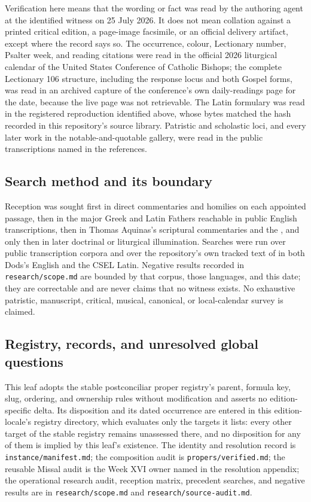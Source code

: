 Verification here means that the wording or fact was read by the authoring
agent at the identified witness on 25 July 2026. It does not mean collation
against a printed critical edition, a page-image facsimile, or an official
delivery artifact, except where the record says so. The occurrence, colour,
Lectionary number, Psalter week, and reading citations were read in the
official 2026 liturgical calendar of the United States Conference of Catholic
Bishops; the complete Lectionary 106 structure, including the response locus
and both Gospel forms, was read in an archived capture of the conference's
own daily-readings page for the date, because the live page was not
retrievable. The Latin formulary was read in the registered reproduction
identified above, whose bytes matched the hash recorded in this repository's
source library. Patristic and scholastic loci, and every later work in the
notable-and-quotable gallery, were read in the public transcriptions named in
the references.

\subsection*{Search method and its boundary}

Reception was sought first in direct commentaries and homilies on each
appointed passage, then in the major Greek and Latin Fathers reachable in
public English transcriptions, then in Thomas Aquinas's scriptural commentaries
and the , and only then in later doctrinal or liturgical
illumination. Searches were run over public transcription corpora and over the
repository's own tracked text of  in both Dods's English
and the CSEL Latin. Negative results recorded in \texttt{research/scope.md} are
bounded by that corpus, those languages, and this date; they are correctable
and are never claims that no witness exists. No exhaustive patristic,
manuscript, critical, musical, canonical, or local-calendar survey is claimed.

\subsection*{Registry, records, and unresolved global questions}

This leaf adopts the stable postconciliar proper registry's parent, formula
key, slug, ordering, and ownership rules without modification and asserts no
edition-specific delta. Its disposition and its dated occurrence are entered in
this edition-locale's registry directory, which evaluates only the targets it
lists: every other target of the stable registry remains unassessed there, and
no disposition for any of them is implied by this leaf's existence. The
identity and resolution record is
\texttt{instance/manifest.md}; the composition audit is
\texttt{propers/verified.md}; the reusable Missal audit is the Week XVI owner
named in the resolution appendix; the operational research audit, reception
matrix, precedent searches, and negative results are in
\texttt{research/scope.md} and \texttt{research/source-audit.md}.

